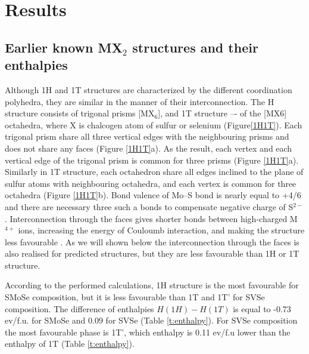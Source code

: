 \documentclass[a4paperm]{article}
\begin{document}
			\section{Results}

\subsection*{Earlier known MX$_2$ structures and their enthalpies}

Although 1H and 1T structures are characterized by the different coordination polyhedra, they are similar in the manner of their interconnection.
The H structure consists of trigonal prisms [MX$_6$], and 1T structure –- of the [MX6] octahedra, where X is chalcogen atom of sulfur or selenium (Figure\ref{1H1T}).
Each trigonal prism share all three vertical edges with the neighbouring prisms and does not share any faces (Figure \ref{1H1T}a).
As the result, each vertex and each vertical edge of the trigonal prism is common for three prisms (Figure \ref{1H1T}a).
Similarly in 1T structure, each octahedron share all edges inclined to the plane of sulfur atoms with neighbouring octahedra, and each vertex is common for three octahedra (Figure \ref{1H1T}b).
Bond valence of Mo--S bond is nearly equal to +4/6 and there are necessary three such a bonds to compensate negative charge of S$^{2-}$.
Interconnection through the faces gives shorter bonds between high-charged M$^{4+}$ ions, increasing the energy of Couloumb interaction, and making the structure less favourable \cite{pauling1929}.
As we will shown below the interconnection through the faces is also realised for predicted structures, but they are less favourable than 1H or 1T structure.

According to the performed calculations, 1H structure is the most favourable for SMoSe composition, but it is less favourable than 1T and 1T' for SVSe composition.
The difference of enthalpies $H(1H)-H(1T)$ is equal to -0.73 ev/f.u. for SMoSe and 0.09 for SVSe (Table \ref{t:enthalpy}).
For SVSe composition the most favourable phase is 1T', which enthalpy is 0.11 ev/f.u lower than the enthalpy of 1T (Table \ref{t:enthalpy}). 
\end{document}
